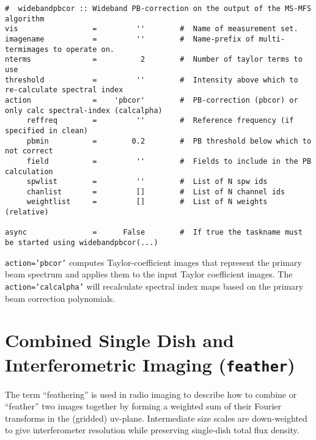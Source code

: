 \small
\begin{verbatim}
#  widebandpbcor :: Wideband PB-correction on the output of the MS-MFS algorithm
vis                 =         ''        #  Name of measurement set.
imagename           =         ''        #  Name-prefix of multi-termimages to operate on.
nterms              =          2        #  Number of taylor terms to use
threshold           =         ''        #  Intensity above which to re-calculate spectral index
action              =    'pbcor'        #  PB-correction (pbcor) or only calc spectral-index (calcalpha)
     reffreq        =         ''        #  Reference frequency (if specified in clean)
     pbmin          =        0.2        #  PB threshold below which to not correct
     field          =         ''        #  Fields to include in the PB calculation
     spwlist        =         ''        #  List of N spw ids
     chanlist       =         []        #  List of N channel ids
     weightlist     =         []        #  List of N weights (relative)

async               =      False        #  If true the taskname must be started using widebandpbcor(...)
\end{verbatim}
\normalsize  

{\tt action='pbcor'} computes Taylor-coefficient images that represent
the primary beam spectrum and applies them to the input Taylor
coefficient images. The {\tt action='calcalpha'} will recalculate
spectral index maps based on the primary beam correction polynomials. 


\section{Combined Single Dish and Interferometric Imaging 
         ({\tt feather})}
\label{section:im.feather}

The term ``feathering'' is used in radio imaging to describe how to
combine or ``feather'' two images together by forming a weighted
sum of their Fourier transforms in the (gridded) uv-plane.
Intermediate size scales are down-weighted to give interferometer
resolution while preserving single-dish total flux density.

